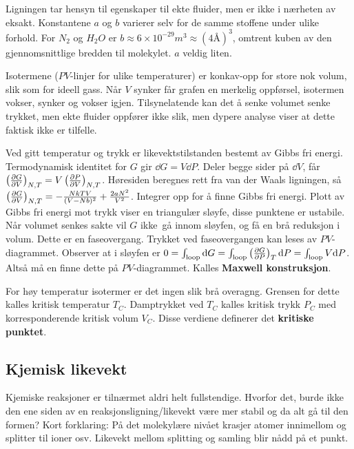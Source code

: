 \documentclass[12pt]{article}
\begin{document}
Ligningen tar hensyn til egenskaper til ekte fluider, men er ikke i nærheten av eksakt. Konstantene $a$ og $b$
varierer selv for de samme stoffene under ulike forhold. For $N_2$ og $H_2 O$ er $b \approx 6 \times 10^{-29} m^3 \approx (4 \text{Å})^3$,
omtrent kuben av den gjennomsnittlige bredden til molekylet. $a$ veldig liten.

Isotermene ($PV$-linjer for ulike temperaturer) er konkav-opp for store nok volum,
slik som for ideell gass. Når $V$ synker får grafen en merkelig oppførsel, isotermen
vokser, synker og vokser igjen. Tilsynelatende kan det å senke volumet senke trykket,
men ekte fluider oppfører ikke slik, men dypere analyse viser at dette faktisk ikke
er tilfelle.

Ved gitt temperatur og trykk er likevektstilstanden bestemt av Gibbs fri energi. Termodynamisk identitet for $G$ gir $\dd G = V \dd P$. Deler begge sider på $\dd V$, får
$\left( \pdv{G}{V} \right)_{N,T} = V\left( \pdv{P}{V} \right)_{N,T}$. Høresiden beregnes rett fra van der Waals ligningen, så $\left( \pdv{G}{V} \right)_{N,T} = - \frac{NkTV}{(V-Nb)^2} + \frac{2aN^2}{V^2}$.
Integrer opp for å finne Gibbs fri energi. Plott av Gibbs fri energi mot trykk viser en triangulær sløyfe,
disse punktene er ustabile. Når volumet senkes sakte vil $G$ ikke gå innom sløyfen, og få en brå reduksjon i volum.
Dette er en faseovergang. Trykket ved faseovergangen kan leses av $PV$-diagrammet. Observer at i sløyfen er
$0 = \int_\text{loop} \dd G = \int_\text{loop} \left( \pdv{G}{P} \right)_{T} \dd P = \int_\text{loop} V\dd P$.
Altså må en finne dette på $PV$-diagrammet. Kalles \textbf{Maxwell konstruksjon}.

For høy temperatur isotermer er det ingen slik brå overagng. Grensen for dette kalles
kritisk temperatur $T_C$. Damptrykket ved $T_C$ kalles kritisk trykk $P_C$ med
korresponderende kritisk volum $V_C$. Disse verdiene definerer det \textbf{kritiske punktet}.

\subsection{Kjemisk likevekt}
Kjemiske reaksjoner er tilnærmet aldri helt fullstendige. Hvorfor det, burde ikke den
ene siden av en reaksjonsligning/likevekt være mer stabil og da alt gå til den formen? Kort forklaring:
På det molekylære nivået krasjer atomer innimellom og splitter til ioner osv. Likevekt
mellom splitting og samling blir nådd på et punkt.
\end{document}
